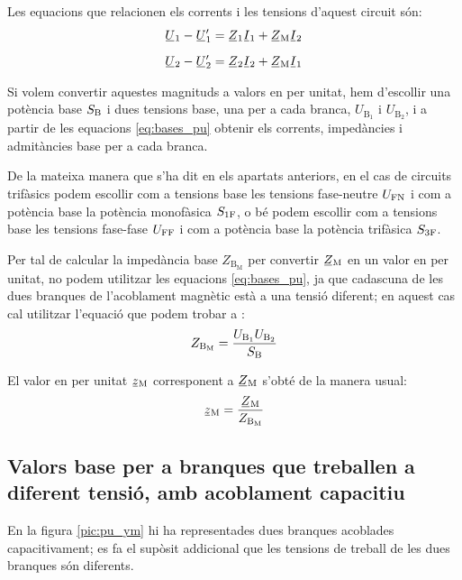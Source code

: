 Les equacions que relacionen els corrents i les tensions d'aquest circuit són:
\begin{subequations}
\begin{align}
    \cmplx{U}_1 - \cmplx{U}'_1 &= \cmplx{Z}_1 \cmplx{I}_1 + \cmplx{Z}\ped{M} \cmplx{I}_2   \\[2mm]
    \cmplx{U}_2 - \cmplx{U}'_2 &= \cmplx{Z}_2 \cmplx{I}_2 + \cmplx{Z}\ped{M} \cmplx{I}_1
\end{align}
\end{subequations}

Si volem convertir aquestes magnituds a valors en per unitat, hem d'escollir  una potència base $S_\mathrm{B}$ i dues tensions base, una  per a cada branca, $U_{\text{B}_1}$ i  $U_{\text{B}_2}$, i a partir de les equacions \eqref{eq:bases_pu} obtenir els corrents, impedàncies i admitàncies base per a cada branca.

De la mateixa manera que s'ha dit en els apartats anteriors, en el cas de circuits trifàsics podem escollir com a tensions base les tensions fase-neutre $U_\mathrm{FN}$ i com a potència base la potència  monofàsica $S_\mathrm{1F}$, o bé podem escollir com a tensions base les tensions fase-fase $U_\mathrm{FF}$ i com a potència base la potència trifàsica $S_\mathrm{3F}$.


Per tal de calcular la impedància base $Z_{\text{B}_\text{M}}$ per convertir $\cmplx{Z}\ped{M}$ en un valor en per unitat, no podem utilitzar les equacions \eqref{eq:bases_pu}, ja que cadascuna de les dues branques de l'acoblament magnètic està a una tensió diferent; en aquest cas cal utilitzar l'equació que podem trobar a \cite{TLE}:
\begin{equation}
    Z_{\text{B}_\text{M}} = \frac{U_{\text{B}_1} U_{\text{B}_2}} {S_\mathrm{B}}
\end{equation}

El valor en per unitat $\cmplx{z}\ped{M}$ corresponent a $\cmplx{Z}\ped{M}$ s'obté de la manera usual:
\begin{equation}
    \cmplx{z}\ped{M} = \frac{\cmplx{Z}\ped{M}}{Z_{\text{B}_\text{M}}}
\end{equation}


\subsection{Valors base per a branques que treballen a diferent tensió, amb acoblament capacitiu}

En la figura \vref{pic:pu_ym} hi ha representades dues branques acoblades capacitivament; es fa el supòsit addicional que les tensions de treball de les dues branques són diferents.

